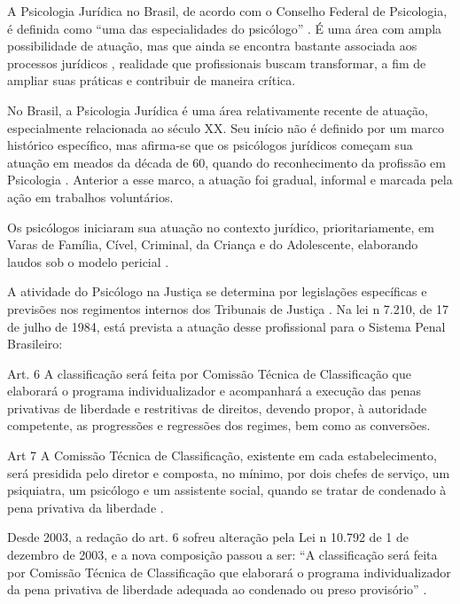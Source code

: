 A Psicologia Jurídica no Brasil, de acordo com o Conselho Federal de Psicologia, é definida como ``uma das especialidades do psicólogo'' \cite[p. 234]{COSTA2009}. É uma área com ampla possibilidade de atuação, mas que ainda se encontra bastante associada aos processos jurídicos , realidade que profissionais buscam transformar, a fim de ampliar suas práticas e contribuir de maneira crítica.

No Brasil, a Psicologia Jurídica é uma área relativamente recente de atuação, especialmente relacionada ao século XX. Seu início não é definido por um marco histórico específico, mas afirma-se que os psicólogos jurídicos começam sua atuação em meados da década de 60, quando do reconhecimento da profissão em Psicologia \cite{LAGO2009}. Anterior a esse marco, a atuação foi gradual, informal e marcada pela ação em trabalhos voluntários.

Os psicólogos iniciaram sua atuação no contexto jurídico, prioritariamente, em Varas de Família, Cível, Criminal, da Criança e do Adolescente, elaborando laudos sob o modelo pericial \cite{COSTA2009}.

A atividade do Psicólogo na Justiça se determina por legislações específicas e previsões nos regimentos internos dos Tribunais de Justiça \cite{COSTA2009}. Na lei n{\textordmasculine} 7.210, de 17 de julho de 1984, está prevista a atuação desse profissional para o Sistema Penal Brasileiro:

\begin{citacao}
	Art. 6{\textordmasculine} A classificação será feita por Comissão Técnica de Classificação que elaborará o programa individualizador e acompanhará a execução das penas privativas de liberdade e restritivas de direitos, devendo propor, à autoridade competente, as progressões e regressões dos regimes, bem como as conversões.
	
	Art 7{\textordmasculine} A Comissão Técnica de Classificação, existente em cada estabelecimento, será presidida pelo diretor e composta, no mínimo, por dois chefes de serviço, um psiquiatra, um psicólogo e um assistente social, quando se tratar de condenado à pena privativa da liberdade \cite{BRASIL1984}.
\end{citacao}

Desde 2003, a redação do art. 6{\textordmasculine} sofreu alteração pela Lei n{\textordmasculine} 10.792 de 1{\textordmasculine} de dezembro de 2003, e a nova composição passou a ser: ``A classificação será feita por Comissão Técnica de Classificação que elaborará o programa individualizador da pena privativa de liberdade adequada ao condenado ou preso provisório'' \cite{BRASIL2003}. 

